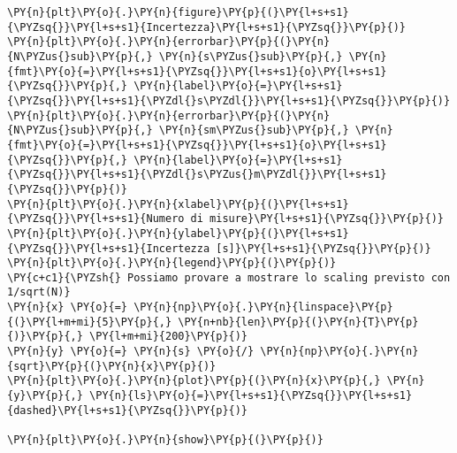 \begin{Verbatim}[label=\makebox{\href{https://github.com/unipi-physics-labs/lab1-sheets/tree/main/snippy/dad_errore_statistico.py}{https://github.com/.../dad\_errore\_statistico.py}},commandchars=\\\{\}]
\PY{n}{plt}\PY{o}{.}\PY{n}{figure}\PY{p}{(}\PY{l+s+s1}{\PYZsq{}}\PY{l+s+s1}{Incertezza}\PY{l+s+s1}{\PYZsq{}}\PY{p}{)}
\PY{n}{plt}\PY{o}{.}\PY{n}{errorbar}\PY{p}{(}\PY{n}{N\PYZus{}sub}\PY{p}{,} \PY{n}{s\PYZus{}sub}\PY{p}{,} \PY{n}{fmt}\PY{o}{=}\PY{l+s+s1}{\PYZsq{}}\PY{l+s+s1}{o}\PY{l+s+s1}{\PYZsq{}}\PY{p}{,} \PY{n}{label}\PY{o}{=}\PY{l+s+s1}{\PYZsq{}}\PY{l+s+s1}{\PYZdl{}s\PYZdl{}}\PY{l+s+s1}{\PYZsq{}}\PY{p}{)}
\PY{n}{plt}\PY{o}{.}\PY{n}{errorbar}\PY{p}{(}\PY{n}{N\PYZus{}sub}\PY{p}{,} \PY{n}{sm\PYZus{}sub}\PY{p}{,} \PY{n}{fmt}\PY{o}{=}\PY{l+s+s1}{\PYZsq{}}\PY{l+s+s1}{o}\PY{l+s+s1}{\PYZsq{}}\PY{p}{,} \PY{n}{label}\PY{o}{=}\PY{l+s+s1}{\PYZsq{}}\PY{l+s+s1}{\PYZdl{}s\PYZus{}m\PYZdl{}}\PY{l+s+s1}{\PYZsq{}}\PY{p}{)}
\PY{n}{plt}\PY{o}{.}\PY{n}{xlabel}\PY{p}{(}\PY{l+s+s1}{\PYZsq{}}\PY{l+s+s1}{Numero di misure}\PY{l+s+s1}{\PYZsq{}}\PY{p}{)}
\PY{n}{plt}\PY{o}{.}\PY{n}{ylabel}\PY{p}{(}\PY{l+s+s1}{\PYZsq{}}\PY{l+s+s1}{Incertezza [s]}\PY{l+s+s1}{\PYZsq{}}\PY{p}{)}
\PY{n}{plt}\PY{o}{.}\PY{n}{legend}\PY{p}{(}\PY{p}{)}
\PY{c+c1}{\PYZsh{} Possiamo provare a mostrare lo scaling previsto con 1/sqrt(N)}
\PY{n}{x} \PY{o}{=} \PY{n}{np}\PY{o}{.}\PY{n}{linspace}\PY{p}{(}\PY{l+m+mi}{5}\PY{p}{,} \PY{n+nb}{len}\PY{p}{(}\PY{n}{T}\PY{p}{)}\PY{p}{,} \PY{l+m+mi}{200}\PY{p}{)}
\PY{n}{y} \PY{o}{=} \PY{n}{s} \PY{o}{/} \PY{n}{np}\PY{o}{.}\PY{n}{sqrt}\PY{p}{(}\PY{n}{x}\PY{p}{)}
\PY{n}{plt}\PY{o}{.}\PY{n}{plot}\PY{p}{(}\PY{n}{x}\PY{p}{,} \PY{n}{y}\PY{p}{,} \PY{n}{ls}\PY{o}{=}\PY{l+s+s1}{\PYZsq{}}\PY{l+s+s1}{dashed}\PY{l+s+s1}{\PYZsq{}}\PY{p}{)}

\PY{n}{plt}\PY{o}{.}\PY{n}{show}\PY{p}{(}\PY{p}{)}
\end{Verbatim}
